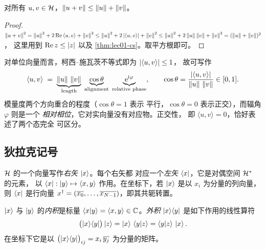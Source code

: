 \begin{corollary}[三角不等式]\label{cor:lec01-tri}
对所有 $u,v\in\mathcal{H}$，$\left\lVert u+v \right\rVert\le\left\lVert u \right\rVert+\left\lVert v \right\rVert$。
\end{corollary}

\begin{proof}
$\left\lVert u+v \right\rVert^{2}=\left\lVert u \right\rVert^{2}+2\,\mathrm{Re}\,\langle u,v\rangle+\left\lVert v \right\rVert^{2}
 \le \left\lVert u \right\rVert^{2}+2\left\lvert \langle u,v\rangle \right\rvert+\left\lVert v \right\rVert^{2}
 \le \left\lVert u \right\rVert^{2}+2\left\lVert u \right\rVert\left\lVert v \right\rVert+\left\lVert v \right\rVert^{2}=(\left\lVert u \right\rVert+\left\lVert v \right\rVert)^{2}$，
这里用到 $\mathrm{Re}\,z\le\left\lvert z \right\rvert$ 以及 \cref{thm:lec01-cs}。取平方根即可。
\end{proof}

对单位向量而言，柯西--施瓦茨不等式即为 $\left\lvert \langle u,v\rangle \right\rvert\le1$，
故可写作
\begin{equation}\label{eq:lec01-geomdecomp}
  \langle u,v\rangle \;=\; \underbrace{\left\lVert u \right\rVert\,\left\lVert v \right\rVert}_{\text{length}}\;
  \underbrace{\cos\theta}_{\text{alignment}}\;\underbrace{\mathrm{e}^{\mathrm{i}\varphi}}_{\text{relative phase}},
  \qquad \cos\theta=\frac{\left\lvert \langle u,v\rangle \right\rvert}{\left\lVert u \right\rVert\,\left\lVert v \right\rVert}\in[0,1].
\end{equation}
模量度两个方向重合的程度（$\cos\theta=1$ 表示
平行，$\cos\theta=0$ 表示正交），而辐角 $\varphi$ 则是一个
\emph{相对相位}，它对实向量没有对应物。正交性，
即 $\langle u,v\rangle=0$，恰好表述了两个态完全
可区分。

\subsection{狄拉克记号}

\begin{definition}[右矢与左矢]\label{def:lec01-braket}
$\mathcal{H}$ 的一个向量写作\emph{右矢} $\ket{x}$。每个右矢都
对应一个\emph{左矢} $\bra{x}$，它是对偶空间 $\mathcal{H}^{*}$ 的元素，
以 $\bra{x}:\ket{y}\mapsto\langle x,y\rangle$ 作用。在坐标下，若 $\ket{x}$
是以 $x_i$ 为分量的列向量，则 $\bra{x}$ 是行向量
$x^{\dagger}=(\overline{x_0},\dots,\overline{x_{N-1}})$，即其共轭转置。
\end{definition}

\begin{definition}[内积与外积]\label{def:lec01-inout}
$\ket{x}$ 与 $\ket{y}$ 的\emph{内积}是标量
$\braket{x|y}=\langle x,y\rangle\in\mathbb{C}$。\emph{外积} $\ket{x}\!\bra{y}$
是如下作用的线性算符
\[
  \bigl(\ket{x}\!\bra{y}\bigr)\ket{z}=\ket{x}\,\braket{y|z}=\braket{y|z}\,\ket{x}.
\]
在坐标下它是以 $\bigl(\ket{x}\!\bra{y}\bigr)_{ij}=x_i\,\overline{y_j}$ 为分量的矩阵。
\end{definition}

